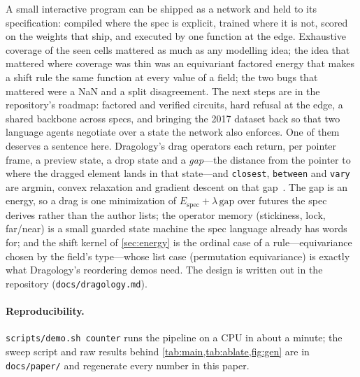 \documentclass{article}
\theoremstyle{plain}
\theoremstyle{definition}
\theoremstyle{remark}
\begin{document}
A small interactive program can be shipped as a network and held to its specification: compiled where the spec is explicit, trained where it is not, scored on the weights that ship, and executed by one function at the edge. Exhaustive coverage of the seen cells mattered as much as any modelling idea; the idea that mattered where coverage was thin was an equivariant factored energy that makes a shift rule the same function at every value of a field; the two bugs that mattered were a NaN and a split disagreement. The next steps are in the repository's roadmap: factored and verified circuits, hard refusal at the edge, a shared backbone across specs, and bringing the 2017 dataset back so that two language agents negotiate over a state the network also enforces. One of them deserves a sentence here. Dragology's drag operators each return, per pointer frame, a preview state, a drop state and a \emph{gap}---the distance from the pointer to where the dragged element lands in that state---and \texttt{closest}, \texttt{between} and \texttt{vary} are argmin, convex relaxation and gradient descent on that gap~\citep{dragology}. The gap is an energy, so a drag is one minimization of $E_{\mathrm{spec}}+\lambda\,\mathrm{gap}$ over futures the spec derives rather than the author lists; the operator memory (stickiness, lock, far/near) is a small guarded state machine the spec language already has words for; and the shift kernel of \cref{sec:energy} is the ordinal case of a rule---equivariance chosen by the field's type---whose list case (permutation equivariance) is exactly what Dragology's reordering demos need. The design is written out in the repository (\texttt{docs/dragology.md}).

\paragraph{Reproducibility.} \texttt{scripts/demo.sh counter} runs the pipeline on a CPU in about a minute; the sweep script and raw results behind \cref{tab:main,tab:ablate,fig:gen} are in \texttt{docs/paper/} and regenerate every number in this paper.




\appendix

\end{document}
